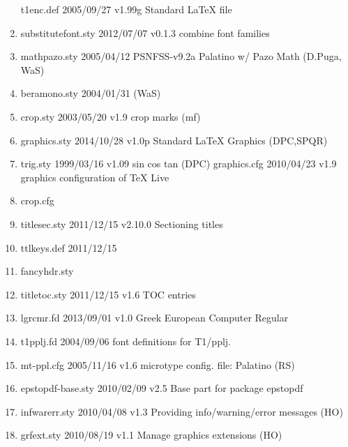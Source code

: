 \begin{enumerate}
t1enc.def 2005/09/27 v1.99g Standard LaTeX file
\item substitutefont.sty 2012/07/07 v0.1.3 combine font families
\item mathpazo.sty 2005/04/12 PSNFSS-v9.2a Palatino w/ Pazo Math (D.Puga, WaS) 
\item beramono.sty 2004/01/31 (WaS)
\item crop.sty 2003/05/20 v1.9 crop marks (mf)
\item graphics.sty 2014/10/28 v1.0p Standard LaTeX Graphics (DPC,SPQR)
\item trig.sty 1999/03/16 v1.09 sin cos tan (DPC)
graphics.cfg 2010/04/23 v1.9 graphics configuration of TeX Live
\item crop.cfg
\item titlesec.sty 2011/12/15 v2.10.0 Sectioning titles
\item ttlkeys.def 2011/12/15
\item fancyhdr.sty 
\item titletoc.sty 2011/12/15 v1.6 TOC entries
\item lgrcmr.fd 2013/09/01 v1.0 Greek European Computer Regular
\item t1pplj.fd 2004/09/06 font definitions for T1/pplj.
\item mt-ppl.cfg 2005/11/16 v1.6 microtype config. file: Palatino (RS)
\item epstopdf-base.sty 2010/02/09 v2.5 Base part for package epstopdf
\item infwarerr.sty 2010/04/08 v1.3 Providing info/warning/error messages (HO)
\item grfext.sty 2010/08/19 v1.1 Manage graphics extensions (HO)

\end{enumerate}
